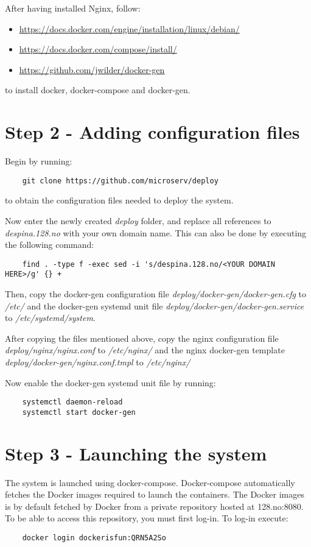 After having installed Nginx, follow:
\begin{itemize}
    \item \url{https://docs.docker.com/engine/installation/linux/debian/}
    \item \url{https://docs.docker.com/compose/install/}
    \item \url{https://github.com/jwilder/docker-gen}
\end{itemize}
to install docker, docker-compose and docker-gen.


\section*{Step 2 - Adding configuration files}
Begin by running:
\begin{verbatim}
    git clone https://github.com/microserv/deploy
\end{verbatim}
to obtain the configuration files needed to deploy the system.

Now enter the newly created \textit{deploy} folder, and replace all references to \textit{despina.128.no} with your own domain name.
This can also be done by executing the following command:
\begin{verbatim}
    find . -type f -exec sed -i 's/despina.128.no/<YOUR DOMAIN HERE>/g' {} +
\end{verbatim}
Then, copy the docker-gen configuration file \textit{deploy/docker-gen/docker-gen.cfg} to \textit{/etc/} and the docker-gen systemd unit file \textit{deploy/docker-gen/docker-gen.service} to \textit{/etc/systemd/system}.

After copying the files mentioned above, copy the nginx configuration file \textit{deploy/nginx/nginx.conf} to \textit{/etc/nginx/} and the nginx docker-gen template \textit{deploy/docker-gen/nginx.conf.tmpl} to \textit{/etc/nginx/}

Now enable the docker-gen systemd unit file by running:
\begin{verbatim}
    systemctl daemon-reload
    systemctl start docker-gen
\end{verbatim}

\section*{Step 3 - Launching the system}
The system is launched using docker-compose. Docker-compose automatically fetches the Docker images required to launch the containers. The Docker images is by default fetched by Docker from a private repository hosted at 128.no:8080. To be able to access this repository, you must first log-in. To log-in execute:
\begin{verbatim}
    docker login dockerisfun:QRN5A2So
\end{verbatim}

